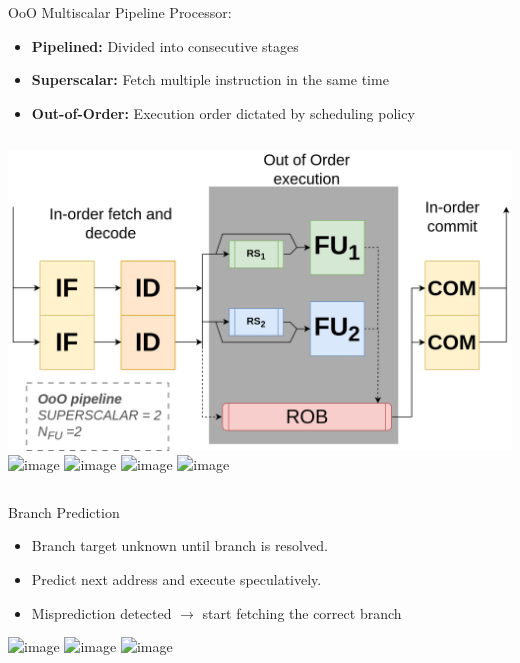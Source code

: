 \documentclass{beamer}
\begin{document}
\begin{frame}{OoO Multiscalar Pipeline}
    Processor:
    \begin{itemize}
        \item \textbf{Pipelined:} Divided into consecutive stages
        \item \textbf{Superscalar:} Fetch multiple instruction in the same time
        \item \textbf{Out-of-Order:} Execution order dictated by scheduling policy
    \end{itemize}


    \begin{columns}
        \includegraphics[width=\textwidth]{pic/pipeline.png}
        \includegraphics<1>[scale=0.14]{pic/multiscalar-demo-1.png}
        \includegraphics<2>[scale=0.14]{pic/multiscalar-demo-2.png}
        \includegraphics<3>[scale=0.14]{pic/multiscalar-demo-3.png}
        \includegraphics<4>[scale=0.14]{pic/multiscalar-demo-4.png}
    \end{columns}

\end{frame}



\begin{frame}{Branch Prediction}
    
    \begin{itemize}
        \item<1-3> Branch target unknown until branch is resolved.
        \item<2-3> Predict next address and execute speculatively.
        \item<3> Misprediction detected $\rightarrow$ start fetching the correct branch
    \end{itemize}

    
    \includegraphics<1>[scale=0.17]{pic/bp-demo-no.png}
    \includegraphics<2>[scale=0.17]{pic/bp-demo-correct.png}
    \includegraphics<3>[scale=0.17]{pic/bp-demo-incorrect.png}

\end{frame}
\end{document}
